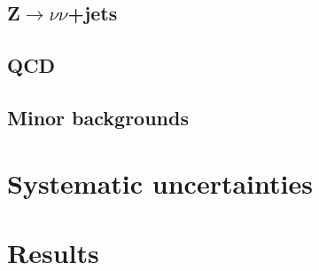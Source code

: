 \subsection{Z$\rightarrow \nu\nu$+jets}%
\label{sec:parkedznunu}

\subsection{QCD}%
\label{sec:parkedQCD}

\subsection{Minor backgrounds}%
\label{sec:parkedminor}

\section{Systematic uncertainties}%
\label{sec:parkedsyst}

\section{Results}%
\label{sec:parkedresults}
